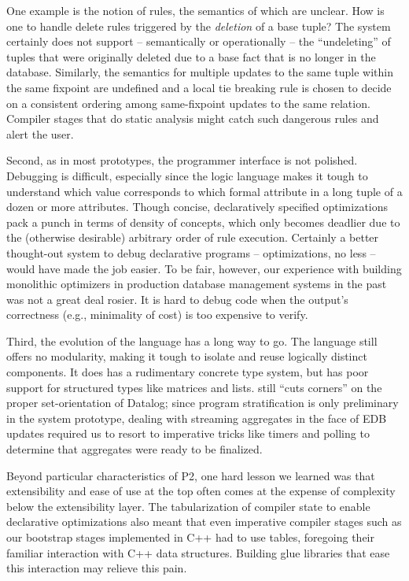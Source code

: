 {One example is the notion of  rules, the semantics of which are
unclear.  How is one to handle delete rules triggered by the \emph{deletion} of
a base tuple?  The system certainly does not support -- semantically or
operationally -- the ``undeleting'' of tuples that were originally deleted due
to a base fact that is no longer in the database.  Similarly, the semantics for
multiple updates to the same tuple within the same fixpoint are undefined and a
local tie breaking rule is chosen to decide on a consistent ordering among
same-fixpoint updates to the same relation.  Compiler stages that do static
analysis might catch such dangerous rules and alert the user.

Second, as in most prototypes, the programmer interface is not polished.
Debugging is difficult, especially since the logic language makes it tough to
understand which value corresponds to which formal attribute in a long tuple of
a dozen or more attributes.  Though concise, declaratively specified
optimizations pack a punch in terms of density of concepts, which only becomes
deadlier due to the (otherwise desirable) arbitrary order of rule execution.
Certainly a better thought-out system to debug declarative programs --
optimizations, no less -- would have made the job easier.  To be fair, however,
our experience with building monolithic optimizers in production database
management systems in the past was not a great deal rosier.  It is hard to
debug code when the output's correctness (e.g., minimality of cost) is too
expensive to verify.

Third, the evolution of the \OVERLOG language has a long way to go.  The
language still offers no modularity, making it tough to isolate and reuse
logically distinct components.  It does has a rudimentary concrete type system,
but has poor support for structured types like matrices and lists.  \OVERLOG
still ``cuts corners'' on the proper set-orientation of Datalog; since program
stratification is only preliminary in the system prototype, dealing with
streaming aggregates in the face of EDB updates required us to resort to
imperative tricks like timers and polling to determine that aggregates were
ready to be finalized.

Beyond particular characteristics of P2, one hard lesson we learned was that
extensibility and ease of use at the top often comes at the expense of
complexity below the extensibility layer.  The tabularization of compiler state
to enable declarative optimizations also meant that even imperative compiler
stages such as our bootstrap stages implemented in C++ had to use tables,
foregoing their familiar interaction with C++ data structures.  Building glue
libraries that ease this interaction may relieve this pain.

}
